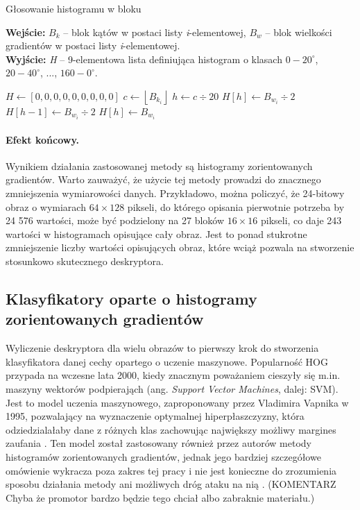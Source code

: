 \documentclass[12pt,a4paper,leqno,oneside,titlepage]{book}
\begin{document}
\begin{algorithm}
\caption{Głosowanie histogramu w bloku}
\hspace*{\algorithmicindent} \textbf{Wejście:} $B_{k}$ -- blok kątów w postaci listy \textit{i}-elementowej, $B_w$ -- blok wielkości gradientów w postaci listy \textit{i}-elementowej. \\
\hspace*{\algorithmicindent} \textbf{Wyjście: } \textit{H} -- 9-elementowa lista definiująca histogram o klasach $0-20^{\circ}$, $20-40^{\circ}$, ..., $160-0^{\circ}.$ 

\begin{algorithmic}
\State $H\gets [0, 0, 0, 0, 0, 0, 0, 0, 0]$
  \State $c\gets \left\lfloor{B_{k_{i}}}\right\rfloor$
  \State $h\gets c\div 20$
    \State $H[h]\gets B_{w_{i}}\div 2$
    \State $H[h-1]\gets B_{w_{i}}\div 2$
  \Else
    \State $H[h]\gets B_{w_{i}}$
  \EndIf
\EndFor
\end{algorithmic}
\end{algorithm}

\paragraph{Efekt końcowy.}
Wynikiem działania zastosowanej metody są histogramy zorientowanych gradientów. Warto zauważyć, że użycie tej metody prowadzi do znacznego zmniejszenia wymiarowości danych. Przykładowo, można policzyć, że 24-bitowy obraz o wymiarach $64\times128$ pikseli, do którego opisania pierwotnie potrzeba by 24 576 wartości, może być podzielony na 27 bloków $16\times16$ pikseli, co daje 243 wartości w histogramach opisujące cały obraz. Jest to ponad stukrotne zmniejszenie liczby wartości opisujących obraz, które wciąż pozwala na stworzenie stosunkowo skutecznego deskryptora\cite{DalalTriggs05Hog}.

\subsection{Klasyfikatory oparte o histogramy zorientowanych gradientów}

Wyliczenie deskryptora dla wielu obrazów to pierwszy krok do stworzenia klasyfikatora danej cechy opartego o uczenie maszynowe. Popularność HOG przypada na wczesne lata 2000, kiedy znacznym poważaniem cieszyły się m.in. maszyny wektorów podpierająch (ang. \textit{Support Vector Machines}, dalej: SVM). Jest to model uczenia maszynowego, zaproponowany przez Vladimira Vapnika w 1995, pozwalający na wyznaczenie optymalnej hiperpłaszczyzny, która odziedzialałaby dane z różnych klas zachowując największy możliwy margines zaufania \cite{Norbert03,Vapnik95}. Ten model został zastosowany również przez autorów metody histogramów zorientowanych gradientów, jednak jego bardziej szczegółowe omówienie wykracza poza zakres tej pracy i nie jest konieczne do zrozumienia sposobu działania metody ani możliwych dróg ataku na nią \cite{DalalTriggs05Hog}. (KOMENTARZ Chyba że promotor bardzo będzie tego chciał albo zabraknie materiału.)
\end{document}
